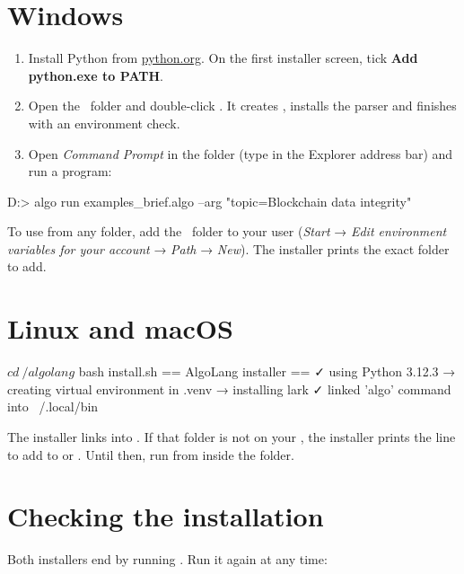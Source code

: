 \section{Windows}

\begin{enumerate}
  \item Install Python from \href{https://www.python.org/downloads/}{python.org}. On the first installer screen, tick \textbf{Add python.exe to PATH}.
  \item Open the \algolang\ folder and double-click . It creates , installs the parser and finishes with an environment check.
  \item Open \emph{Command Prompt} in the folder (type  in the Explorer address bar) and run a program:
\end{enumerate}

\begin{terminal}
D:\algolang> algo run examples\research_brief.algo --arg "topic=Blockchain data integrity"
\end{terminal}

To use  from any folder, add the \algolang\ folder to your user  (\emph{Start} → \emph{Edit environment variables for your account} → \emph{Path} → \emph{New}). The installer prints the exact folder to add.

\section{Linux and macOS}

\begin{terminal}
$ cd ~/algolang
$ bash install.sh
== AlgoLang installer ==
✓ using Python 3.12.3
→ creating virtual environment in .venv
→ installing lark
✓ linked 'algo' command into ~/.local/bin
\end{terminal}

The installer links  into . If that folder is not on your , the installer prints the line to add to  or . Until then, run  from inside the folder.

\section{Checking the installation}

Both installers end by running . Run it again at any time:

